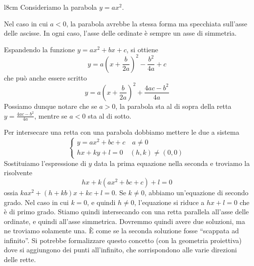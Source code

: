 \documentclass[a4paper]{article}
\begin{document}
\setlength{\intextsep}{0pt}%
\begin{wrapfigure}{l}{8cm}
    Consideriamo la parabola \(y=ax^2\).
    \begin{center}
    \end{center}
    \vspace{-1cm}
\end{wrapfigure}

Nel caso in cui \(a<0\), la parabola avrebbe la stessa forma ma specchiata sull'asse delle ascisse.
In ogni caso, l'asse delle ordinate è sempre un asse di simmetria.

Espandendo la funzione \(y=ax^2 + bx + c\), si ottiene
\[
    y = a{\left(x + \frac{b}{2a}\right)}^2 - \frac{b^2}{4a} + c
\]
che può anche essere scritto
\[
    y = a{\left(x + \frac{b}{2a}\right)}^2 + \frac{4ac - b^2}{4a}
\]
Possiamo dunque notare che se \(a>0\), la parabola sta al di sopra della retta
\(y=\frac{4ac - b^2}{4a}\), mentre se \(a<0\) sta al di sotto.

\wrapfill


Per intersecare una retta con una parabola dobbiamo mettere le due a sistema
\[
    \begin{cases}
        y = ax^2 + bc + c \quad a \neq 0 \\
        hx + ky + l = 0 \quad (h,k)\neq (0,0)
    \end{cases}
\]
Sostituiamo l'espressione di \(y\) data la prima equazione nella seconda e troviamo la risolvente
\[
    hx + k(ax^2 + bc + c) + l = 0 
\]
ossia \(kax^2 + (h+kb)x + kc + l = 0\).
Se \(k \neq 0\), abbiamo un'equazione di secondo grado. Nel caso in cui \(k=0\), e quindi \(h\neq 0\),
l'equazione si riduce a \(hx + l =0\) che è di primo grado.
Stiamo quindi intersecando con una retta parallela all'asse delle ordinate, e quindi all'asse simmetrica.
Dovremmo quindi avere due soluzioni, ma ne troviamo solamente una. È come se la seconda soluzione
fosse ``scappata ad infinito''. Si potrebbe formalizzare questo concetto (con la geometria proiettiva)
dove si aggiungono dei punti all'infinito, che sorrispondono alle varie direzioni delle rette.
\end{document}
